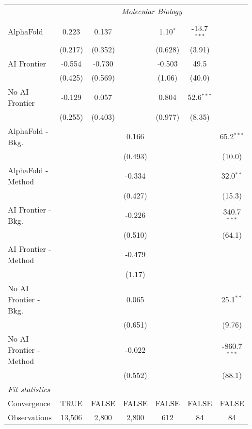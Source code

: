 \begin{tabular}{lcccccc}
 & \multicolumn{6}{c}{\textit{Molecular Biology}} \\ \\
   AlphaFold               & 0.223   & 0.137   &         & 1.10$^{*}$ & -13.7$^{***}$ &   \\   
                           & (0.217) & (0.352) &         & (0.628)    & (3.91)        &   \\   
   AI Frontier             & -0.554  & -0.730  &         & -0.503     & 49.5          &   \\   
                           & (0.425) & (0.569) &         & (1.06)     & (40.0)        &   \\   
   No AI Frontier          & -0.129  & 0.057   &         & 0.804      & 52.6$^{***}$  &   \\   
                           & (0.255) & (0.403) &         & (0.977)    & (8.35)        &   \\   
   AlphaFold - Bkg.        &         &         & 0.166   &            &               & 65.2$^{***}$\\   
                           &         &         & (0.493) &            &               & (10.0)\\   
   AlphaFold - Method      &         &         & -0.334  &            &               & 32.0$^{**}$\\   
                           &         &         & (0.427) &            &               & (15.3)\\   
   AI Frontier - Bkg.      &         &         & -0.226  &            &               & 340.7$^{***}$\\   
                           &         &         & (0.510) &            &               & (64.1)\\   
   AI Frontier - Method    &         &         & -0.479  &            &               &   \\   
                           &         &         & (1.17)  &            &               &   \\   
   No AI Frontier - Bkg.   &         &         & 0.065   &            &               & 25.1$^{**}$\\   
                           &         &         & (0.651) &            &               & (9.76)\\   
   No AI Frontier - Method &         &         & -0.022  &            &               & -860.7$^{***}$\\   
                           &         &         & (0.552) &            &               & (88.1)\\   
   \midrule
   \emph{Fit statistics}\\
   Convergence             &TRUE     & FALSE   & FALSE   & FALSE      & FALSE         & FALSE\\  
   Observations            & 13,506  & 2,800   & 2,800   & 612        & 84            & 84\\  
   

\end{tabular}
